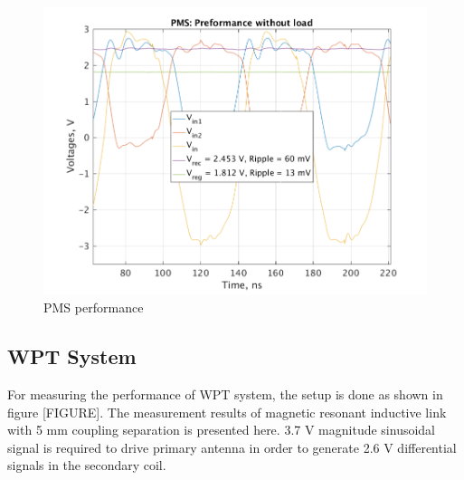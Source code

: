 \documentclass[UKenglish]{ifimaster}  %
\begin{document}
\begin{figure} [!htbp]
  \centering
  \includegraphics[width=\textwidth]{img/meas/pms_test.pdf} 
 \caption{PMS performance} 
\label{fig:meas_pms} 
\end{figure}

\subsection{WPT System} %
For measuring the performance of WPT system, the setup is done as shown in figure  [FIGURE]. The measurement results of magnetic resonant inductive link with 5 mm 
coupling separation is presented here. 3.7 V magnitude sinusoidal  signal is required to drive primary antenna in order to generate 2.6 V differential signals in the secondary coil.\\
\end{document}
